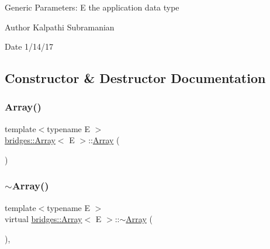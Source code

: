 Generic Parameters\+: E the application data type

\begin{DoxyAuthor}{Author}
Kalpathi Subramanian 
\end{DoxyAuthor}
\begin{DoxyDate}{Date}
1/14/17 
\end{DoxyDate}


\subsection{Constructor \& Destructor Documentation}
\mbox{\label{classbridges_1_1_array_a958421b86ff55303b5fc7d505109f9fe}} 
\subsubsection{\texorpdfstring{Array()}{Array()}\hspace{0.1cm}{\footnotesize\ttfamily [1/6]}}
{\footnotesize\ttfamily template$<$typename E $>$ \\
\mbox{\hyperlink{classbridges_1_1_array}{bridges\+::\+Array}}$<$ E $>$\+::\mbox{\hyperlink{classbridges_1_1_array}{Array}} (\begin{DoxyParamCaption}{ }\end{DoxyParamCaption})\hspace{0.3cm}{\ttfamily [inline]}}

\mbox{\label{classbridges_1_1_array_aa80b2d2ebc4c27e74a8eaaeb6907b474}} 
\subsubsection{\texorpdfstring{$\sim$\+Array()}{~Array()}}
{\footnotesize\ttfamily template$<$typename E $>$ \\
virtual \mbox{\hyperlink{classbridges_1_1_array}{bridges\+::\+Array}}$<$ E $>$\+::$\sim$\mbox{\hyperlink{classbridges_1_1_array}{Array}} (\begin{DoxyParamCaption}{ }\end{DoxyParamCaption})\hspace{0.3cm}{\ttfamily [inline]}, {\ttfamily [virtual]}}

